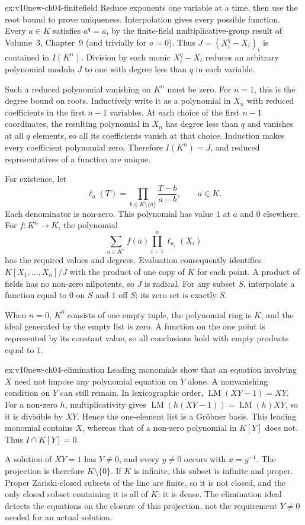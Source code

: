 \begin{solution}{ex:v10new-ch04-finitefield}
\idea Reduce exponents one variable at a time, then use the root bound to prove uniqueness. Interpolation gives every possible function.
\writeup Every $a\in K$ satisfies $a^q=a$, by the finite-field multiplicative-group result of Volume~3, Chapter~9 (and trivially for $a=0$). Thus $J=(X_i^q-X_i)_i$ is contained in $I(K^n)$. Division by each monic $X_i^q-X_i$ reduces an arbitrary polynomial modulo $J$ to one with degree less than $q$ in each variable.

Such a reduced polynomial vanishing on $K^n$ must be zero. For $n=1$, this is the degree bound on roots. Inductively write it as a polynomial in $X_n$ with reduced coefficients in the first $n-1$ variables. At each choice of the first $n-1$ coordinates, the resulting polynomial in $X_n$ has degree less than $q$ and vanishes at all $q$ elements, so all its coefficients vanish at that choice. Induction makes every coefficient polynomial zero. Therefore $I(K^n)=J$, and reduced representatives of a function are unique.

For existence, let
\[
\ell_a(T)=\prod_{b\in K\setminus\{a\}}\frac{T-b}{a-b},
\qquad a\in K.
\]
Each denominator is non-zero. This polynomial has value $1$ at $a$ and $0$ elsewhere. For $f\colon K^n\to K$, the polynomial
\[
\sum_{a\in K^n} f(a)\prod_{i=1}^n\ell_{a_i}(X_i)
\]
has the required values and degrees. Evaluation consequently identifies $K[X_1,\ldots,X_n]/J$ with the product of one copy of $K$ for each point. A product of fields has no non-zero nilpotents, so $J$ is radical. For any subset $S$, interpolate a function equal to $0$ on $S$ and $1$ off $S$; its zero set is exactly $S$.

When $n=0$, $K^0$ consists of one empty tuple, the polynomial ring is $K$, and the ideal generated by the empty list is zero. A function on the one point is represented by its constant value, so all conclusions hold with empty products equal to $1$.
\end{solution}

\begin{solution}{ex:v10new-ch04-elimination}
\idea Leading monomials show that an equation involving $X$ need not impose any polynomial equation on $Y$ alone. A nonvanishing condition on $Y$ can still remain.
\writeup In lexicographic order, $\operatorname{LM}(XY-1)=XY$. For a non-zero $h$, multiplicativity gives $\operatorname{LM}(h(XY-1))=\operatorname{LM}(h)XY$, so it is divisible by $XY$. Hence the one-element list is a Gröbner basis. This leading monomial contains $X$, whereas that of a non-zero polynomial in $K[Y]$ does not. Thus $I\cap K[Y]=0$.

A solution of $XY=1$ has $Y\ne0$, and every $y\ne0$ occurs with $x=y^{-1}$. The projection is therefore $K\setminus\{0\}$. If $K$ is infinite, this subset is infinite and proper. Proper Zariski-closed subsets of the line are finite, so it is not closed, and the only closed subset containing it is all of $K$: it is dense. The elimination ideal detects the equations on the closure of this projection, not the requirement $Y\ne0$ needed for an actual solution.
\end{solution}

